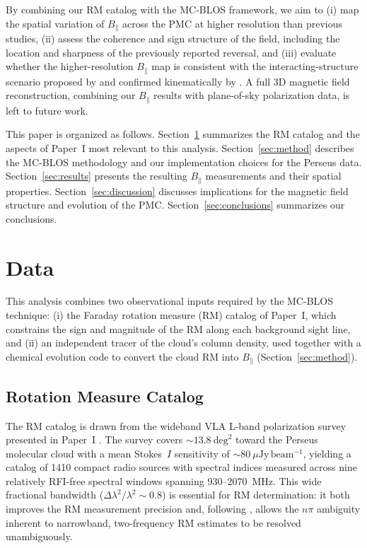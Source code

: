 \documentclass[twocolumn]{aastex631}
\begin{document}
By combining our RM catalog with the MC-BLOS framework, we aim to (i) map the spatial variation of $B_\parallel$ across the PMC at higher resolution than previous studies, (ii) assess the coherence and sign structure of the field, including the location and sharpness of the previously reported reversal, and (iii) evaluate whether the higher-resolution $B_\parallel$ map is consistent with the interacting-structure scenario proposed by \citet{tahani2022b} and confirmed kinematically by \citet{kounkel2022}. A full 3D magnetic field reconstruction, combining our $B_\parallel$ results with plane-of-sky polarization data, is left to future work.

This paper is organized as follows. Section~\ref{sec:data} summarizes the RM catalog and the aspects of Paper~I most relevant to this analysis. Section~\ref{sec:method} describes the MC-BLOS methodology and our implementation choices for the Perseus data. Section~\ref{sec:results} presents the resulting $B_\parallel$ measurements and their spatial properties. Section~\ref{sec:discussion} discusses implications for the magnetic field structure and evolution of the PMC. Section~\ref{sec:conclusions} summarizes our conclusions.
\section{Data}
\label{sec:data}

This analysis combines two observational inputs required by the MC-BLOS technique: (i) the Faraday rotation measure (RM) catalog of Paper~I, which constrains the sign and magnitude of the RM along each background sight line, and (ii) an independent tracer of the cloud's column density, used together with a chemical evolution code to convert the cloud RM into $B_\parallel$ (Section~\ref{sec:method}).

\subsection{Rotation Measure Catalog}

The RM catalog is drawn from the wideband VLA L-band polarization survey presented in Paper~I \citep{hajizadeh2026comprehensive}. The survey covers $\sim13.8~\mathrm{deg}^2$ toward the Perseus molecular cloud with a mean Stokes~$I$ sensitivity of $\sim80~\mu\mathrm{Jy\,beam^{-1}}$, yielding a catalog of 1410 compact radio sources with spectral indices measured across nine relatively RFI-free spectral windows spanning 930--2070~MHz. This wide fractional bandwidth ($\Delta\lambda^2/\lambda^2 \sim 0.8$) is essential for RM determination: it both improves the RM measurement precision and, following \citet{brentjens2005}, allows the $n\pi$ ambiguity inherent to narrowband, two-frequency RM estimates to be resolved unambiguously.
\end{document}
